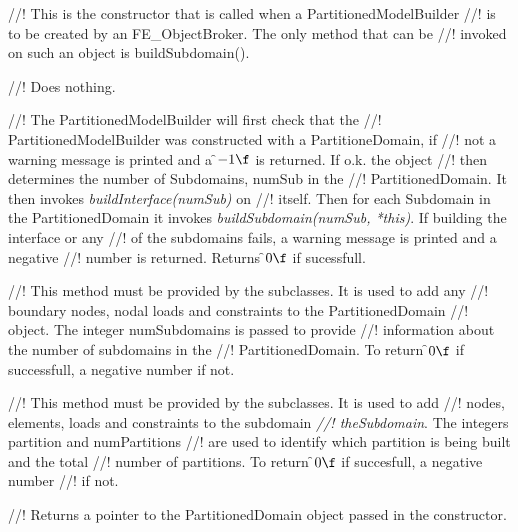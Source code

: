 //! This is the constructor that is called when a PartitionedModelBuilder
//! is to be created by an FE\_ObjectBroker. The only method that can be
//! invoked on such an object is buildSubdomain().

//! Does nothing.


//! The PartitionedModelBuilder will first check that the
//! PartitionedModelBuilder was constructed with a PartitioneDomain, if
//! not a warning message is printed and a \f$-1\f$ is returned. If o.k. the object 
//! then determines the number of Subdomains, \p numSub in the
//! PartitionedDomain. It then invokes {\em buildInterface(numSub)} on 
//! itself. Then for each Subdomain in the PartitionedDomain it invokes
{\em buildSubdomain(numSub, *this)}. If building the interface or any
//! of the subdomains fails, a warning message is printed and a negative
//! number is returned. Returns \f$0\f$ if sucessfull.

//! This method must be provided by the subclasses. It is used to add any
//! boundary nodes, nodal loads and constraints to the PartitionedDomain
//! object. The integer \p numSubdomains is passed to provide
//! information about the number of subdomains in the
//! PartitionedDomain. To return \f$0\f$ if successfull, a negative number if not.


//! This method must be provided by the subclasses. It is used to add
//! nodes, elements, loads and constraints to the subdomain {\em
//! theSubdomain}. The integers \p partition and \p numPartitions
//! are used to identify which partition is being built and the total
//! number of partitions. To return \f$0\f$ if succesfull, a negative number
//! if not.


//! Returns a pointer to the PartitionedDomain object passed in the constructor.


